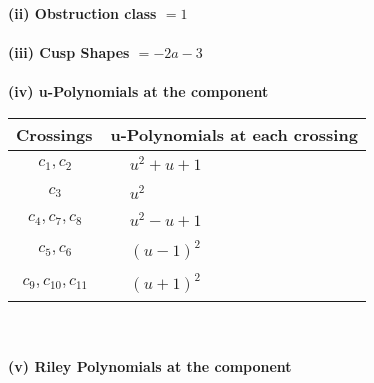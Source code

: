\documentclass[1p]{elsarticle_modified}
\theoremstyle{definition}
\begin{document}
\flushleft \textbf{(ii) Obstruction class $= 1$}\\~\\
\flushleft \textbf{(iii) Cusp Shapes $= -2 a-3$}\\~\\
\newpage\renewcommand{\arraystretch}{1}
\flushleft \textbf{(iv) u-Polynomials at the component}\newline \\
\begin{tabular}{m{50pt}|m{274pt}}
Crossings & \hspace{64pt}u-Polynomials at each crossing \\
\hline $$\begin{aligned}c_{1},c_{2}\end{aligned}$$&$\begin{aligned}
&u^2+u+1
\end{aligned}$\\
\hline $$\begin{aligned}c_{3}\end{aligned}$$&$\begin{aligned}
&u^2
\end{aligned}$\\
\hline $$\begin{aligned}c_{4},c_{7},c_{8}\end{aligned}$$&$\begin{aligned}
&u^2- u+1
\end{aligned}$\\
\hline $$\begin{aligned}c_{5},c_{6}\end{aligned}$$&$\begin{aligned}
&(u-1)^2
\end{aligned}$\\
\hline $$\begin{aligned}c_{9},c_{10},c_{11}\end{aligned}$$&$\begin{aligned}
&(u+1)^2
\end{aligned}$\\
\hline
\end{tabular}\\~\\
\newpage\renewcommand{\arraystretch}{1}
\flushleft \textbf{(v) Riley Polynomials at the component}\newline \\
\end{document}
